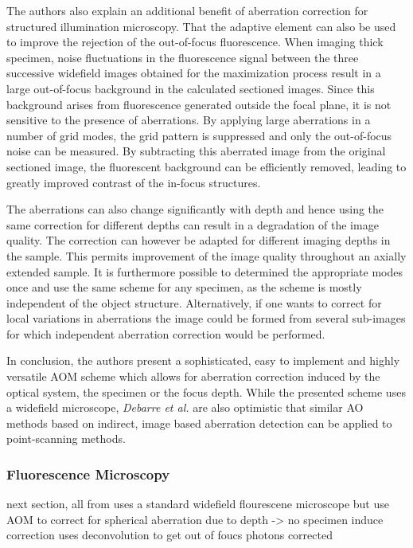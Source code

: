 The authors also explain an additional benefit of aberration correction for structured illumination microscopy. That the adaptive element can also be used to improve the rejection of the out-of-focus fluorescence. When imaging thick specimen, noise fluctuations in the fluorescence signal between the three successive widefield images obtained for the maximization process result in a large out-of-focus background in the calculated sectioned images. Since this background arises from fluorescence generated outside the focal plane, it is not  sensitive to the presence of aberrations. By applying large aberrations in a number of grid modes, the grid pattern is suppressed and only the out-of-focus noise can be measured. By subtracting this aberrated image from the original sectioned image, the fluorescent background can be efficiently removed, leading to greatly improved contrast of the in-focus structures.

The aberrations can also change significantly with depth and hence using the same correction for different depths can result in a degradation of the image quality.  The correction can however be adapted for different imaging depths in the sample. This permits improvement of the image quality throughout an axially extended sample.
It is furthermore possible to determined the appropriate modes once and use the same scheme for any specimen, as the scheme is mostly independent of the object structure. Alternatively, if one wants to correct for local variations in aberrations the image could be formed from several sub-images for which independent aberration correction would be performed.

In conclusion, the authors present a sophisticated, easy to implement and highly versatile AOM scheme which allows for aberration correction induced by the optical system, the specimen or the focus depth. While the presented scheme uses a widefield microscope, \emph{Debarre et al.} are also optimistic that similar AO methods based on indirect, image based aberration detection can be applied to point-scanning methods. 


\subsubsection{Fluorescence Microscopy}
\label{sec:FlourescnecMicroscopy}

next section, all from \cite{wide_AOM_FM_spehrical_correction} uses a 
standard widefield flourescene microscope but use AOM to correct for 
spherical aberration due to depth -> no specimen induce correction
uses deconvolution to get out of foucs photons corrected

